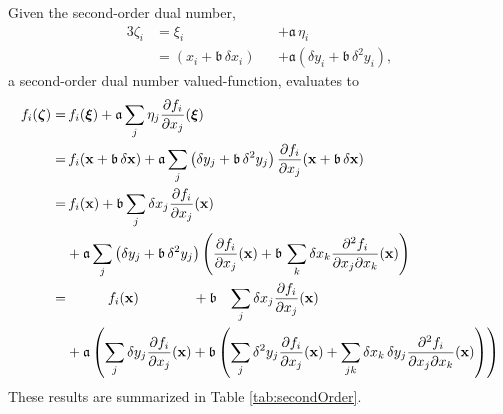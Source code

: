 Given the second-order dual number,
%
\begin{alignat*}{3}
\zeta_{i} 
&=
\xi_{i} 
&&+ \mathfrak{a} \, \eta_{i}
\\
&=
\left( x_{i} + \mathfrak{b} \, \delta x_{i} \right)
&&+ \mathfrak{a} \left( \delta y_{i} + \mathfrak{b} \, \delta^{2} y_{i} \right),
\end{alignat*}
%
a second-order dual number valued-function, evaluates to
%
\begin{align*}
f_{i} \! \left(  \mbox{\boldmath{$\zeta$}} \right)
=& \,
f_{i} \! \left(  \mbox{\boldmath{$\xi$}} \right) 
+ \mathfrak{a} \sum_{j} \eta_{j} \frac{ \partial f_{i} }{ \partial x_{j} } \! \left(  \mbox{\boldmath{$\xi$}} \right) 
\\
=& \,
f_{i} \! \left( \mathbf{x} + \mathfrak{b} \, \delta \mathbf{x} \right) 
+ \mathfrak{a} \sum_{j} \left( \delta y_{j} + \mathfrak{b} \, \delta^{2} y_{j} \right)
\frac{ \partial f_{i} }{ \partial x_{j} } 
\! \left( \mathbf{x} + \mathfrak{b} \, \delta \mathbf{x} \right) 
\\
=& \,
f_{i} \! \left( \mathbf{x} \right) 
+ \mathfrak{b} \sum_{j} \delta x_{j}  \frac{ \partial f_{i} }{ \partial x_{j} } \! \left( \mathbf{x} \right)
\\
&+ 
\mathfrak{a} \sum_{j} \left( \delta y_{j} + \mathfrak{b} \, \delta^{2} y_{j} \right)
\left( \frac{ \partial f_{i} }{ \partial x_{j} } \! \left( \mathbf{x}\right) + 
\mathfrak{b} \, \sum_{k} \delta x_{k} 
\frac{ \partial^{2} f_{i} }{ \partial x_{j} \partial x_{k} } \! \left( \mathbf{x} \right) \right) 
\\
=&
\quad\quad\quad 
f_{i} \! \left( \mathbf{x} \right) 
\quad\quad\quad\;\;\;
+ \mathfrak{b} \;\;\;
\sum_{j} \delta x_{j}  \frac{ \partial f_{i} }{ \partial x_{j} } \! \left( \mathbf{x} \right)
\\
&+ 
\mathfrak{a} \left( 
\sum_{j} \delta y_{j} \frac{ \partial f_{i} }{ \partial x_{j} } \! \left( \mathbf{x} \right) 
+ \mathfrak{b} \left(
\sum_{j} \delta^{2} y_{j} \frac{ \partial f_{i} }{ \partial x_{j} } \! \left( \mathbf{x} \right)
+ \sum_{jk} \delta x_{k} \, \delta y_{j}
\frac{ \partial^{2} f_{i} }{ \partial x_{j} \partial x_{k} } \! \left( \mathbf{x} \right)
\right)
\right)
\end{align*}
%
These results are summarized in Table \ref{tab:secondOrder}.

